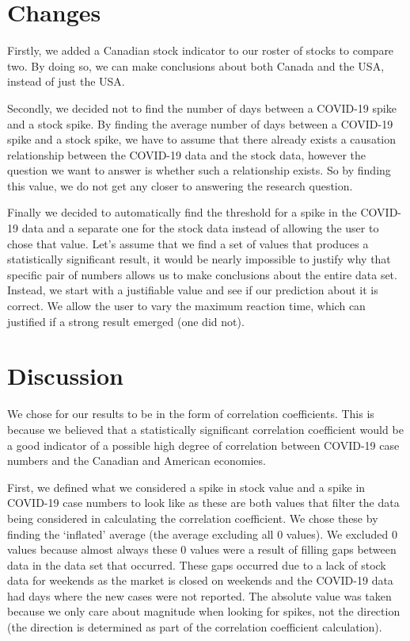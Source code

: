 \documentclass[fontsize=11pt]{article}
\begin{document}
\section*{Changes}

Firstly, we added a Canadian stock indicator to our roster of stocks to compare two.
By doing so, we can make conclusions about both Canada and the USA, instead of just the USA.

Secondly, we decided not to find the number of days between a COVID-19 spike and a stock spike.
By finding the average number of days between a COVID-19 spike and a stock spike, we have to assume that there already exists a causation relationship between the COVID-19 data and the stock data, however the question we want to answer is whether such a relationship exists.
So by finding this value, we do not get any closer to answering the research question.

Finally we decided to automatically find the threshold for a spike in the COVID-19 data and a separate one for the stock data instead of allowing the user to chose that value.
Let's assume that we find a set of values that produces a statistically significant result, it would be nearly impossible to justify why that specific pair of numbers allows us to make conclusions about the entire data set.
Instead, we start with a justifiable value and see if our prediction about it is correct.
We allow the user to vary the maximum reaction time, which can justified if a strong result emerged (one did not).

\section*{Discussion}

We chose for our results to be in the form of correlation coefficients.
This is because we believed that a statistically significant correlation coefficient would be a good indicator of a possible high degree of correlation between COVID-19 case numbers and the Canadian and American economies.

First, we defined what we considered a spike in stock value and a spike in COVID-19 case numbers to look like as these are both values that filter the data being considered in calculating the correlation coefficient. 
We chose these by finding the `inflated' average (the average excluding all 0 values). 
We excluded 0 values because almost always these 0 values were a result of filling gaps between data in the data set that occurred. 
These gaps occurred due to a lack of stock data for weekends as the market is closed on weekends and the COVID-19 data had days where the new cases were not reported.
The absolute value was taken because we only care about magnitude when looking for spikes, not the direction (the direction is determined as part of the correlation coefficient calculation).
\end{document}

